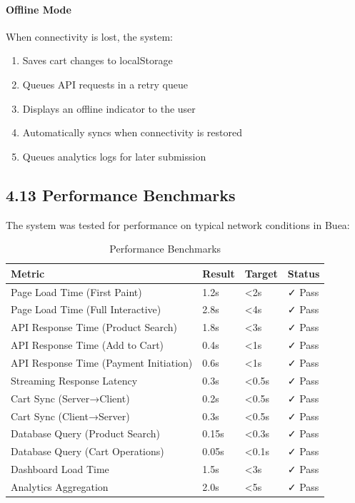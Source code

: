 \documentclass[12pt,a4paper]{article}
\begin{document}
\paragraph{Offline Mode}

When connectivity is lost, the system:

\begin{enumerate}
    \item Saves cart changes to localStorage
    \item Queues API requests in a retry queue
    \item Displays an offline indicator to the user
    \item Automatically syncs when connectivity is restored
    \item Queues analytics logs for later submission
\end{enumerate}

\subsection{4.13 Performance Benchmarks}

The system was tested for performance on typical network conditions in Buea:

\begin{table}[h]
\centering
\caption{Performance Benchmarks}
\label{tab:performance}
\begin{tabular}{p{6cm}p{3cm}p{3cm}p{2cm}}
\toprule
\textbf{Metric} & \textbf{Result} & \textbf{Target} & \textbf{Status} \\
\midrule
Page Load Time (First Paint) & 1.2s & <2s & ✓ Pass \\
Page Load Time (Full Interactive) & 2.8s & <4s & ✓ Pass \\
API Response Time (Product Search) & 1.8s & <3s & ✓ Pass \\
API Response Time (Add to Cart) & 0.4s & <1s & ✓ Pass \\
API Response Time (Payment Initiation) & 0.6s & <1s & ✓ Pass \\
Streaming Response Latency & 0.3s & <0.5s & ✓ Pass \\
Cart Sync (Server→Client) & 0.2s & <0.5s & ✓ Pass \\
Cart Sync (Client→Server) & 0.3s & <0.5s & ✓ Pass \\
Database Query (Product Search) & 0.15s & <0.3s & ✓ Pass \\
Database Query (Cart Operations) & 0.05s & <0.1s & ✓ Pass \\
Dashboard Load Time & 1.5s & <3s & ✓ Pass \\
Analytics Aggregation & 2.0s & <5s & ✓ Pass \\
\bottomrule
\end{tabular}
\end{table}
\end{document}
